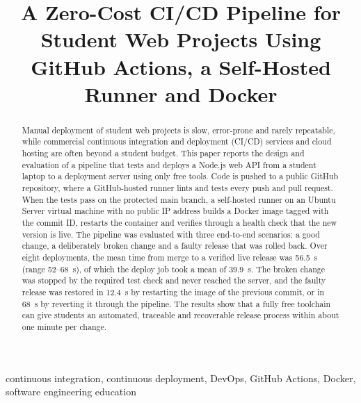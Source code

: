 \documentclass[conference]{IEEEtran}
\begin{document}
\title{A Zero-Cost CI/CD Pipeline for Student Web Projects Using GitHub Actions, a Self-Hosted Runner and Docker}

\author{
}

\maketitle

\begin{abstract}
Manual deployment of student web projects is slow, error-prone and rarely repeatable, while commercial continuous integration and deployment (CI/CD) services and cloud hosting are often beyond a student budget. This paper reports the design and evaluation of a pipeline that tests and deploys a Node.js web API from a student laptop to a deployment server using only free tools. Code is pushed to a public GitHub repository, where a GitHub-hosted runner lints and tests every push and pull request. When the tests pass on the protected main branch, a self-hosted runner on an Ubuntu Server virtual machine with no public IP address builds a Docker image tagged with the commit ID, restarts the container and verifies through a health check that the new version is live. The pipeline was evaluated with three end-to-end scenarios: a good change, a deliberately broken change and a faulty release that was rolled back. Over eight deployments, the mean time from merge to a verified live release was 56.5~s (range 52--68~s), of which the deploy job took a mean of 39.9~s. The broken change was stopped by the required test check and never reached the server, and the faulty release was restored in 12.4~s by restarting the image of the previous commit, or in 68~s by reverting it through the pipeline. The results show that a fully free toolchain can give students an automated, traceable and recoverable release process within about one minute per change.
\end{abstract}

\begin{IEEEkeywords}
continuous integration, continuous deployment, DevOps, GitHub Actions, Docker, software engineering education
\end{IEEEkeywords}
\end{document}
